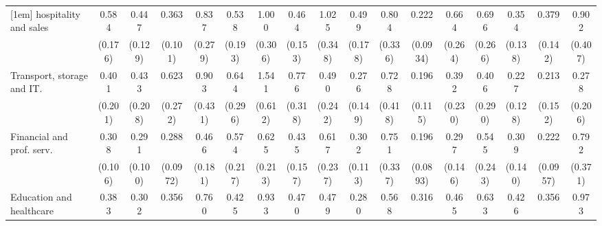 {\begin{tabular}{l*{16}{c}}
[1em]
hospitality and sales&       0.584         &       0.447\sym{**} &       0.363\sym{***}&       0.837         &       0.538         &       1.000         &       0.464\sym{*}  &       1.025         &       0.499         &       0.804         &       0.222\sym{***}&       0.664         &       0.696         &       0.354\sym{**} &       0.379\sym{**} &       0.902         \\
                    &     (0.176)         &     (0.129)         &     (0.101)         &     (0.279)         &     (0.193)         &     (0.306)         &     (0.153)         &     (0.348)         &     (0.178)         &     (0.336)         &    (0.0934)         &     (0.264)         &     (0.266)         &     (0.138)         &     (0.142)         &     (0.407)         \\
[1em]
Transport, storage and IT.&       0.401         &       0.433         &       0.623         &       0.903         &       0.644         &       1.541         &       0.776         &       0.490         &       0.276\sym{*}  &       0.728         &       0.196\sym{**} &       0.392         &       0.406         &       0.227\sym{**} &       0.213\sym{*}  &       0.278         \\
                    &     (0.201)         &     (0.208)         &     (0.272)         &     (0.431)         &     (0.296)         &     (0.612)         &     (0.318)         &     (0.242)         &     (0.149)         &     (0.418)         &     (0.115)         &     (0.230)         &     (0.290)         &     (0.128)         &     (0.152)         &     (0.206)         \\
[1em]
Financial and prof. serv.&       0.308\sym{***}&       0.291\sym{***}&       0.288\sym{***}&       0.466\sym{*}  &       0.574         &       0.625         &       0.435\sym{*}  &       0.617         &       0.302\sym{**} &       0.751         &       0.196\sym{***}&       0.297\sym{*}  &       0.545         &       0.309\sym{**} &       0.222\sym{***}&       0.792         \\
                    &     (0.106)         &     (0.100)         &    (0.0972)         &     (0.181)         &     (0.217)         &     (0.213)         &     (0.157)         &     (0.237)         &     (0.113)         &     (0.337)         &    (0.0893)         &     (0.146)         &     (0.243)         &     (0.140)         &    (0.0957)         &     (0.371)         \\
[1em]
Education and healthcare&       0.383\sym{**} &       0.302\sym{***}&       0.356\sym{**} &       0.760         &       0.425\sym{*}  &       0.933         &       0.470\sym{*}  &       0.479\sym{*}  &       0.280\sym{***}&       0.568         &       0.316\sym{**} &       0.465         &       0.633         &       0.426\sym{*}  &       0.356\sym{**} &       0.973         \\

\end{tabular}}
